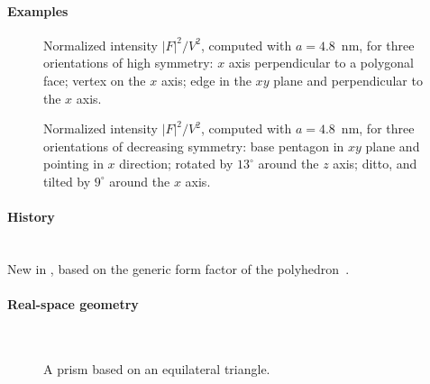 \paragraph{Examples}\strut

\begin{figure}[H]
\begin{center}
\end{center}
\caption{Normalized intensity $|F|^2/V^2$,
computed with $a=4.8$~nm,
for three orientations of high symmetry:
$x$ axis perpendicular to a polygonal face;
vertex on the $x$ axis;
edge in the $xy$ plane and perpendicular to the $x$ axis.}
\end{figure}

\begin{figure}[H]
\begin{center}
\end{center}
\caption{Normalized intensity $|F|^2/V^2$,
computed with $a=4.8$~nm,
for three orientations of decreasing symmetry:
base pentagon in $xy$ plane and pointing in $x$ direction;
rotated by $13^\circ$ around the $z$ axis;
ditto, and tilted by $9^\circ$ around the $x$ axis.}
\end{figure}

\paragraph{History}\strut\\
New in ,
based on the generic form factor of the polyhedron~\cite{Wut17}.


 \label{SPrism3}

\paragraph{Real-space geometry}\strut\\

\begin{figure}[H]
\hfill
{}
\hfill
{}
\hfill
{}
\hfill
\caption{A prism based on an equilateral triangle.}
\end{figure}

